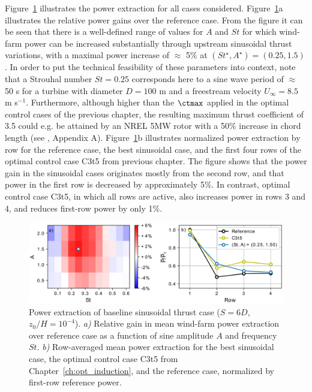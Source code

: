 Figure~\ref{fig:sinus_baseline} illustrates the power extraction for all cases considered. Figure~\ref{fig:sinus_baseline}a illustrates the relative power gains over the reference case. From the figure it can be seen that there is a well-defined range of values for $A$ and $St$ for which wind-farm power can be increased substantially through upstream sinusoidal thrust variations, with a maximal power increase of $\approx$ 5\% at $(St^\star, A^\star) = (0.25, 1.5)$. In order to put the technical feasibility of these parameters into context, note that a Strouhal number $St = 0.25$ corresponds here to a sine wave period of $\approx$ 50 s for a turbine with diameter $D = 100$ m and a freestream velocity $U_\infty = 8.5$ m s$^{-1}$. Furthermore, although higher than the $\ctmax$ applied in the optimal control cases of the previous chapter, the resulting maximum thrust coefficient of 3.5 could e.g. be attained by an NREL 5MW rotor with a 50\% increase in chord length (see \cite{goit2015optimal}, Appendix A). Figure~\ref{fig:sinus_baseline}b illustrates normalized power extraction by row for the reference case, the best sinusoidal case, and the first four rows of the optimal control case C3t5 from previous chapter. The figure shows that the power gain in the sinusoidal cases originates mostly from the second row, and that power in the first row is decreased by approximately 5\%. In contrast, optimal control case C3t5, in which all rows are active, also increases power in rows 3 and 4, and reduces first-row power by only 1\%. 
\begin{figure}
	\centering
	\includegraphics[width=\textwidth]{chapters/analysis_induction_control/gains_turbulent_6D_6D_6D_wide_inphase2.eps}
	\caption[Power extraction of baseline sinusoidal thrust case.]{Power extraction of baseline sinusoidal thrust case ($S = 6D$, $z_0/H = 10^{-4}$). \emph{a) } Relative gain in mean wind-farm power extraction over reference case as a function of sine amplitude $A$ and frequency $St$. \emph{b) } Row-averaged mean power extraction for the best sinusoidal case, the optimal control case C3t5 from Chapter~\ref{ch:opt_induction}, and the reference case, normalized by first-row reference power.\label{fig:sinus_baseline} }
\end{figure}

